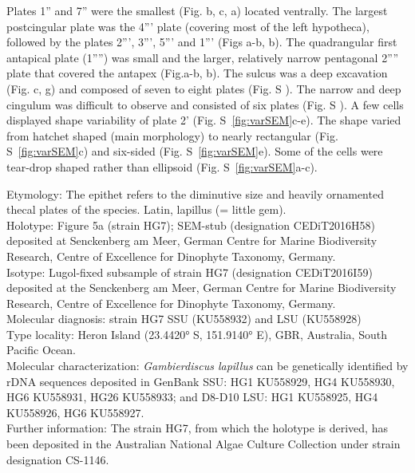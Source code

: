 \documentclass[12pt]{article}
\begin{document}
Plates 1'' and 7'' were the smallest (Fig. b, c, a) located ventrally. %
The largest postcingular plate was the 4''' plate (covering most of the left hypotheca), followed by the plates 2''', 3''', 5''' and 1''' (Figs a-b, b). %
The quadrangular first antapical plate (1'''') was small and the larger, relatively narrow pentagonal 2'''' plate that covered the antapex (Fig.a-b, b). %
The sulcus was a deep excavation (Fig. c, g) and composed of seven to eight plates (Fig. S ). %
The narrow and deep cingulum was difficult to observe and consisted of six plates (Fig. S ). %
A few cells displayed shape variability of plate 2' (Fig. S~\ref{fig:varSEM}c-e). %
The shape varied from hatchet shaped (main morphology) to nearly rectangular (Fig. S~\ref{fig:varSEM}c) and six-sided (Fig. S~\ref{fig:varSEM}e).%
Some of the cells were tear-drop shaped rather than ellipsoid (Fig. S~\ref{fig:varSEM}a-c). %

Etymology: The epithet refers to the diminutive size and heavily ornamented thecal plates of the species. Latin, lapillus (= little gem). \\
Holotype: Figure 5a (strain HG7); SEM-stub (designation CEDiT2016H58) deposited at Senckenberg am Meer, German Centre for Marine Biodiversity Research, Centre of Excellence for Dinophyte Taxonomy, Germany. \\
Isotype: Lugol-fixed subsample of strain HG7 (designation CEDiT2016I59) deposited at the Senckenberg am Meer, German Centre for Marine Biodiversity Research, Centre of Excellence for Dinophyte Taxonomy, Germany. \\
Molecular diagnosis: strain HG7 SSU (KU558932) and LSU (KU558928)\\
Type locality: Heron Island (23.4420° S, 151.9140° E), GBR, Australia, South Pacific Ocean.\\
Molecular characterization: \textit{Gambierdiscus lapillus} can be genetically identified by rDNA sequences deposited in GenBank SSU: HG1 KU558929, HG4 KU558930, HG6 KU558931, HG26 KU558933; and D8-D10 LSU: HG1 KU558925, HG4 KU558926, HG6 KU558927. \\
Further information: The strain HG7, from which the holotype is derived, has been deposited in the Australian National Algae Culture Collection under strain designation CS-1146.
\end{document}

